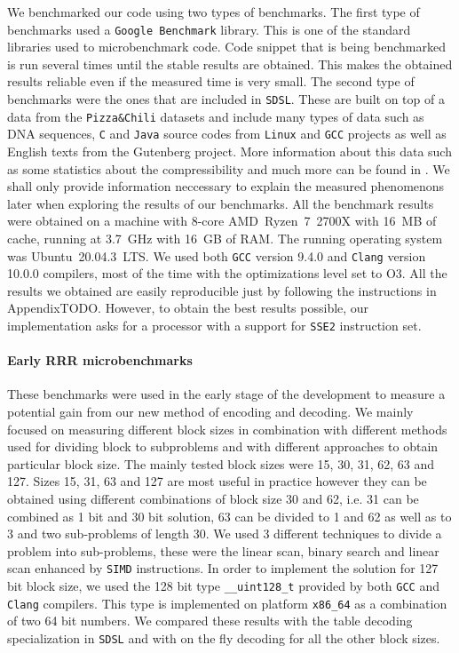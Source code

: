 We benchmarked our code using two types of benchmarks. The first type of benchmarks used
a \texttt{Google Benchmark} library. This is one of the standard libraries used to
microbenchmark code. Code snippet that is being benchmarked is run several times until
the stable results are obtained. This makes the obtained results reliable even if the
measured time is very small. The second type of benchmarks
were the ones that are included in \texttt{SDSL}. These are built on top of a data from the
\texttt{Pizza\&Chili} datasets \citep{ferragina2005pizza} and include many types of data such
as DNA sequences, \texttt{C} and \texttt{Java} source codes from \texttt{Linux} and \texttt{GCC}
projects as well as English texts from the Gutenberg project. More information about this
data such as some statistics about the compressibility and much more can be found in
\cite{ferragina2009compressed}. We shall only provide information neccessary to explain the
measured phenomenons later when exploring the results of our benchmarks. All the benchmark
results were obtained on a machine with 8-core AMD~Ryzen~7~2700X with 16~MB of cache, running
at 3.7~GHz with 16~GB of RAM. The running operating system was Ubuntu~20.04.3~LTS.
We used both \texttt{GCC} version 9.4.0 and \texttt{Clang} version 10.0.0 compilers,
most of the time with the optimizations level set to O3. All the results we obtained are
easily reproducible just by following the instructions in AppendixTODO. However, to obtain
the best results possible, our implementation asks for a processor with a support for \texttt{SSE2}
instruction set.

\paragraph{Early RRR microbenchmarks}

These benchmarks were used in the early stage of the development to measure a potential gain from
our new method of encoding and decoding. We mainly focused on measuring different block sizes
in combination with different methods used for dividing block to subproblems and with different
approaches to obtain particular block size. The mainly tested block sizes were 15, 30, 31, 62, 63
and 127. Sizes 15, 31, 63 and 127 are most useful in practice however they can be obtained using
different combinations of block size 30 and 62, i.e. 31 can be combined as 1 bit and 30 bit solution,
63 can be divided to 1 and 62 as well as to 3 and two sub-problems of length 30.
We used 3 different techniques to divide a problem into sub-problems, these were the linear scan,
binary search and linear scan enhanced by \texttt{SIMD} instructions. In order to implement the
solution for 127 bit block size, we used the 128 bit type \texttt{\_\_uint128\_t} provided by both
\texttt{GCC} and \texttt{Clang} compilers. This type is implemented on platform \texttt{x86\_64}
as a combination of two 64 bit numbers. We compared these results with the table decoding specialization
in \texttt{SDSL} and with on the fly decoding for all the other block sizes. 

